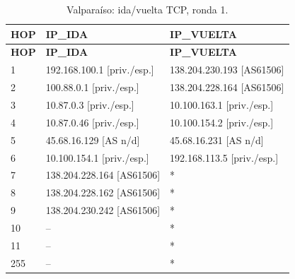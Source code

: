 \endgroup
\begingroup
\fontsize{9}{11}\selectfont
\begin{longtable}{p{0.95cm}p{7.075cm}p{7.075cm}}
\caption{Valparaíso: ida/vuelta TCP, ronda 1.}\label{anexo:vuelta:138.204.230.242:TCP:1} \\
\toprule
\textbf{HOP} & \textbf{IP\_\allowbreak{}IDA} & \textbf{IP\_\allowbreak{}VUELTA} \\ \midrule
\endfirsthead
\toprule
\textbf{HOP} & \textbf{IP\_\allowbreak{}IDA} & \textbf{IP\_\allowbreak{}VUELTA} \\ \midrule
\endhead
1 & 192.168.100.1 [priv./esp.] & 138.204.230.193 [AS61506] \\
2 & 100.88.0.1 [priv./esp.] & 138.204.228.164 [AS61506] \\
3 & 10.87.0.3 [priv./esp.] & 10.100.163.1 [priv./esp.] \\
4 & 10.87.0.46 [priv./esp.] & 10.100.154.2 [priv./esp.] \\
5 & 45.68.16.129 [AS n/d] & 45.68.16.231 [AS n/d] \\
6 & 10.100.154.1 [priv./esp.] & 192.168.113.5 [priv./esp.] \\
7 & 138.204.228.164 [AS61506] & * \\
8 & 138.204.228.162 [AS61506] & * \\
9 & 138.204.230.242 [AS61506] & * \\
10 & -- & * \\
11 & -- & * \\
255 & -- & * \\
\bottomrule
\end{longtable}
\endgroup
